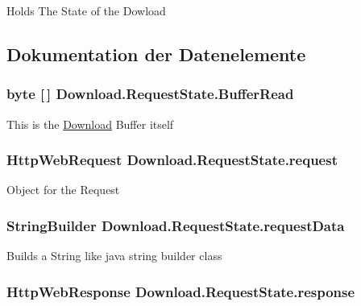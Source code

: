 Holds The State of the Dowload 

\subsection{Dokumentation der Datenelemente}
\hypertarget{class_download_1_1_request_state_aec613e05d7ced342aa5d6fb28aff5bc7}{
\subsubsection[{Buffer\-Read}]{\setlength{\rightskip}{0pt plus 5cm}byte \mbox{[}$\,$\mbox{]} Download.\-Request\-State.\-Buffer\-Read}}\label{class_download_1_1_request_state_aec613e05d7ced342aa5d6fb28aff5bc7}
This is the \hyperlink{namespace_download}{Download} Buffer itself \hypertarget{class_download_1_1_request_state_a0a74186a43e3ed603eb2236b08ecd753}{
\subsubsection[{request}]{\setlength{\rightskip}{0pt plus 5cm}Http\-Web\-Request Download.\-Request\-State.\-request}}\label{class_download_1_1_request_state_a0a74186a43e3ed603eb2236b08ecd753}
Object for the Request \hypertarget{class_download_1_1_request_state_ab20c7c09c5efb2e831d8157ac2fea1ae}{
\subsubsection[{request\-Data}]{\setlength{\rightskip}{0pt plus 5cm}String\-Builder Download.\-Request\-State.\-request\-Data}}\label{class_download_1_1_request_state_ab20c7c09c5efb2e831d8157ac2fea1ae}
Builds a String like java string builder class \hypertarget{class_download_1_1_request_state_af85537a87aa3c35d8cc1058e143f4201}{
\subsubsection[{response}]{\setlength{\rightskip}{0pt plus 5cm}Http\-Web\-Response Download.\-Request\-State.\-response}}\label{class_download_1_1_request_state_af85537a87aa3c35d8cc1058e143f4201}
